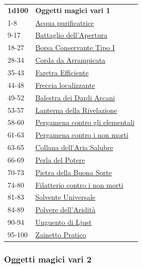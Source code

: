 \begin{multicols}{2}
{{\small\begin{tabularx}{0.45\textwidth}{lX}
\textbf{1d100} & \textbf{Oggetti magici vari 1}\\
1-8 & \hyperlink{Acquapurificatrice}{Acqua purificatrice}\\
9-17 & \hyperlink{Battagliodell'Apertura}{Battaglio dell'Apertura}\\
18-27 & \hyperlink{BorsaConservanteTipoI}{Borsa Conservante Tipo I}\\
28-34 & \hyperlink{CordadaArrampicata}{Corda da Arrampicata}\\
35-43 & \hyperlink{FaretraEfficiente}{Faretra Efficiente}\\
44-48 & \hyperlink{Freccialocalizzante}{Freccia localizzante}\\
49-52 & \hyperlink{BalestradeiDardiArcani}{Balestra dei Dardi Arcani}\\
53-57 & \hyperlink{LanternadellaRivelazione}{Lanterna della Rivelazione}\\
58-60 & \hyperlink{Pergamenacontroglielementali}{Pergamena contro gli elementali}\\
61-63 & \hyperlink{Pergamenacontroinonmorti}{Pergamena contro i non morti}\\
63-65 & \hyperlink{Collanadell'AriaSalubre}{Collana dell'Aria Salubre}\\
66-69 & \hyperlink{PerladelPotere}{Perla del Potere}\\
70-73 & \hyperlink{PietradellaBuonaSorte}{Pietra della Buona Sorte}\\
74-80 & \hyperlink{Filatteriocontroinonmorti}{Filatterio contro i non morti}\\
81-83 & \hyperlink{SolventeUniversale}{Solvente Universale}\\
84-89 & \hyperlink{Polveredell'Aridità}{Polvere dell'Aridità}\\
90-94 & \hyperlink{UnguentodiLjust}{Unguento di Ljust}\\
95-100 & \hyperlink{ZainettoPratico}{Zainetto Pratico}
\end{tabularx}}

\subsubsection{Oggetti magici vari 2}\hypertarget{Oggetti Magici Vari 2}{}

}
\end{multicols}
